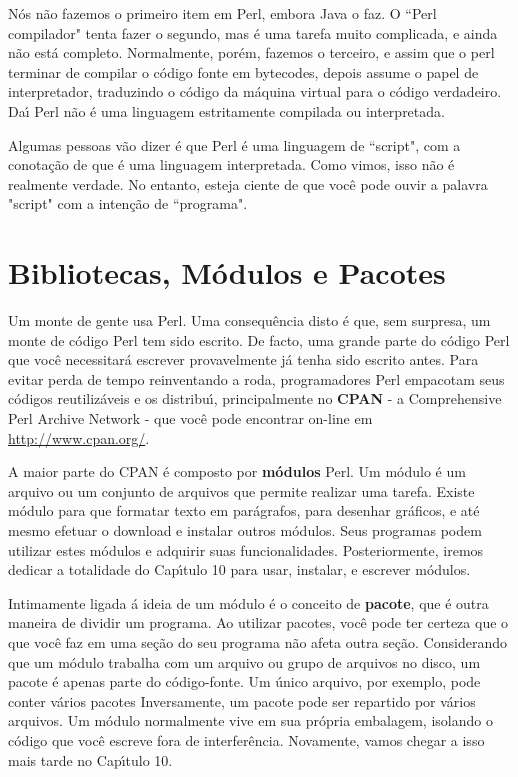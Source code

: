 \documentclass[a4paper,12pt,twoside]{book}
\begin{document}
\noindent N\'os n\~ao fazemos o primeiro item em Perl, embora Java o faz. O ``Perl compilador" tenta 
fazer o segundo, mas \'e uma tarefa muito complicada, e ainda n\~ao est\'a completo. 
Normalmente, por\'em, fazemos o terceiro, e assim que o perl terminar de compilar o c\'odigo 
fonte em bytecodes, depois assume o papel de interpretador, traduzindo o c\'odigo da m\'aquina 
virtual para o c\'odigo verdadeiro. Da\'{\i} Perl n\~ao \'e uma linguagem estritamente 
compilada ou interpretada.\medskip

\noindent Algumas pessoas v\~ao dizer \'e que Perl \'e uma linguagem de ``script", com a 
conota\c{c}\~ao de que \'e uma linguagem interpretada. Como vimos, isso n\~ao \'e realmente 
verdade. No entanto, esteja ciente de que voc\^e pode ouvir a palavra "script" com a inten\c{c}\~ao 
de ``programa".

\section{Bibliotecas, M\'odulos e Pacotes}

\noindent Um monte de gente usa Perl. Uma consequ\^encia disto \'e que, sem surpresa, um monte de 
c\'odigo Perl tem sido escrito. De facto, uma grande parte do c\'odigo Perl que voc\^e necessitar\'a 
escrever provavelmente j\'a tenha sido escrito antes. Para evitar perda de tempo reinventando a roda, 
programadores Perl empacotam seus c\'odigos reutiliz\'aveis e os distribu\'{\i}, principalmente no 
\textbf{CPAN} - a Comprehensive Perl Archive Network - que voc\^e pode encontrar on-line em 
\url{http://www.cpan.org/}.\medskip

\noindent A maior parte do CPAN \'e composto por \textbf{m\'odulos} Perl. Um m\'odulo \'e um 
arquivo ou um conjunto de arquivos que permite realizar uma tarefa. Existe m\'odulo para que 
formatar texto em par\'agrafos, para desenhar gr\'aficos, e at\'e mesmo efetuar o download e 
instalar outros m\'odulos. Seus programas podem utilizar estes m\'odulos e adquirir suas 
funcionalidades. Posteriormente, iremos dedicar a totalidade do Cap\'{\i}tulo 10 para usar, 
instalar, e escrever m\'odulos.\medskip

\noindent Intimamente ligada \'a ideia de um m\'odulo \'e o conceito de \textbf{pacote}, 
que \'e outra maneira de dividir um programa. Ao utilizar pacotes, voc\^e pode ter certeza 
que o que voc\^e faz em uma se\c{c}\~ao do seu programa n\~ao afeta outra se\c{c}\~ao. 
Considerando que um m\'odulo trabalha com um arquivo ou grupo de arquivos no disco, um 
pacote \'e apenas parte do c\'odigo-fonte. Um \'unico arquivo, por exemplo, pode conter 
v\'arios pacotes Inversamente, um pacote pode ser repartido por v\'arios arquivos. Um 
m\'odulo normalmente vive em sua pr\'opria embalagem, isolando o c\'odigo que voc\^e 
escreve fora de interfer\^encia. Novamente, vamos chegar a isso mais tarde no Cap\'{\i}tulo 10.\medskip
\end{document}
